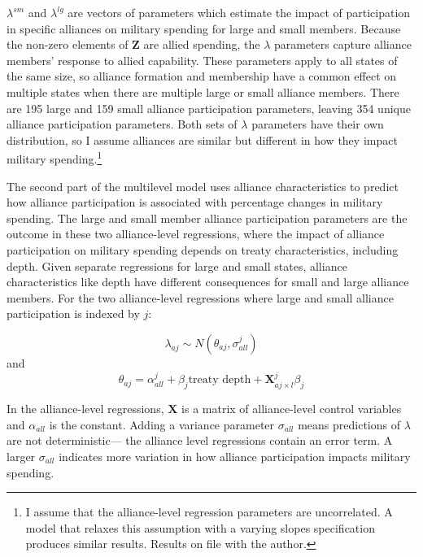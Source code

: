 \documentclass[12pt]{article}
\begin{document}
$\lambda^{sm}$ and $\lambda^{lg}$ are vectors of parameters which estimate the impact of participation in specific alliances on military spending for large and small members. 
Because the non-zero elements of $\textbf{Z}$ are allied spending, the $\lambda$ parameters capture alliance members' response to allied capability. 
These parameters apply to all states of the same size, so alliance formation and membership have a common effect on multiple states when there are multiple large or small alliance members.
There are 195 large and 159 small alliance participation parameters, leaving 354 unique alliance participation parameters. 
Both sets of $\lambda$ parameters have their own distribution, so I assume alliances are similar but different in how they impact military spending.\footnote{I assume that the alliance-level regression parameters are uncorrelated. A model that relaxes this assumption with a varying slopes specification produces similar results. Results on file with the author.}


The second part of the multilevel model uses alliance characteristics to predict how alliance participation is associated with percentage changes in military spending. 
The large and small member alliance participation parameters are the outcome in these two alliance-level regressions, where the impact of alliance participation on military spending depends on treaty characteristics, including depth. 
Given separate regressions for large and small states, alliance characteristics like depth have different consequences for small and large alliance members. 
For the two alliance-level regressions where large and small alliance participation is indexed by $j$:


\begin{equation}
\lambda_{aj} \sim N(\theta_{aj}, \sigma^{j}_{all})
\end{equation} 
and 
\begin{equation}
\theta_{aj} = \alpha^{j}_{all} + \beta_{j} \mbox{treaty depth} + \textbf{X}^{j}_{aj \times l} \beta_{j}
\end{equation}


In the alliance-level regressions, $\textbf{X}$ is a matrix of alliance-level control variables and $\alpha_{all}$ is the constant.
Adding a variance parameter $\sigma_{all}$ means predictions of $\lambda$ are not deterministic--- the alliance level regressions contain an error term. 
A larger $\sigma_{all}$ indicates more variation in how alliance participation impacts military spending. 
\end{document}
